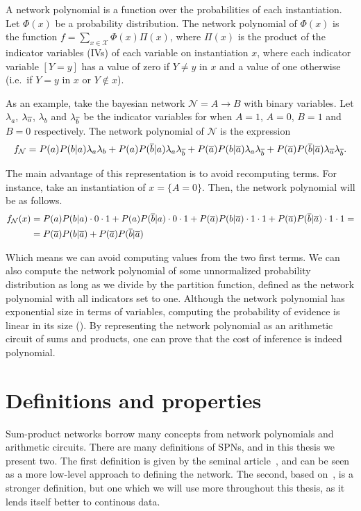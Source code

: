 A network polynomial is a function over the probabilities of each instantiation. Let $\Phi(x)$ be a
probability distribution. The network polynomial of $\Phi(x)$ is the function
$f=\sum_{x\in\mathcal{X}}\Phi(x)\Pi(x)$, where $\Pi(x)$ is the product of the indicator variables
(IVs) of each variable on instantiation $x$, where each indicator variable $[Y=y]$ has a value of
zero if $Y\neq y$ in $x$ and a value of one otherwise (i.e.\ if $Y=y$ in $x$ or $Y\not\in x$).

As an example, take the bayesian network $\mathcal{N}=A\to B$ with binary variables. Let
$\lambda_a$, $\lambda_{\overline{a}}$, $\lambda_b$ and $\lambda_{\overline{b}}$ be the indicator variables for
when $A=1$, $A=0$, $B=1$ and $B=0$ respectively. The network polynomial of $\mathcal{N}$ is the
expression
\begin{equation*}
  f_{\mathcal{N}}=P(a)P(b|a)\lambda_a\lambda_b+P(a)P(\overline{b}|a)\lambda_a\lambda_{\overline{b}}+
  P(\overline{a})P(b|\overline{a})\lambda_a\lambda_{\overline{b}}+P(\overline{a})P(\overline{b}|\overline{a})\lambda_{\overline{a}}
  \lambda_{\overline{b}}.
\end{equation*}

The main advantage of this representation is to avoid recomputing terms. For instance, take an
instantiation of $x=\{A=0\}$. Then, the network polynomial will be as follows.
\begin{align*}
  f_{\mathcal{N}}(x)&=P(a)P(b|a)\cdot 0\cdot 1+P(a)P(\overline{b}|a)\cdot 0\cdot
  1+P(\overline{a})P(b|\overline{a})\cdot 1\cdot 1+P(\overline{a})P(\overline{b}|\overline{a})\cdot 1\cdot 1=\\
  &=P(\overline{a})P(b|\overline{a})+P(\overline{a})P(\overline{b}|\overline{a})
\end{align*}

Which means we can avoid computing values from the two first terms. We can also compute the network
polynomial of some unnormalized probability distribution as long as we divide by the partition
function, defined as the network polynomial with all indicators set to one. Although the network
polynomial has exponential size in terms of variables, computing the probability of evidence is
linear in its size (\cite{diff-approach-darwiche}). By representing the network polynomial as an
arithmetic circuit of sums and products, one can prove that the cost of inference is indeed
polynomial.

\section{Definitions and properties}

Sum-product networks borrow many concepts from network polynomials and arithmetic circuits. There
are many definitions of SPNs, and in this thesis we present two. The first definition is given by
the seminal article~\cite{poon-domingos}, and can be seen as a more low-level approach to defining
the network\@. The second, based on~\cite{gens-domingos}, is a stronger definition, but one which
we will use more throughout this thesis, as it lends itself better to continous data.


